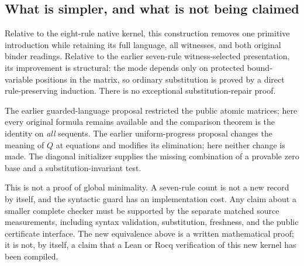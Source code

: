 \subsection{What is simpler, and what is not being claimed}

Relative to the eight-rule native kernel, this construction removes one
primitive introduction while retaining its full language, all witnesses,
and both original binder readings.  Relative to the earlier seven-rule
witness-selected presentation, its improvement is structural: the mode
depends only on protected bound-variable positions in the matrix, so
ordinary substitution is proved by a direct rule-preserving induction.
There is no exceptional substitution-repair proof.

The earlier guarded-language proposal restricted the public atomic
matrices; here every original formula remains available and the comparison
theorem is the identity on \emph{all} sequents.  The earlier
uniform-progress proposal changes the meaning of $Q$ at equations and
modifies its elimination; here neither change is made.  The diagonal
initializer supplies the missing combination of a provable zero base and
a substitution-invariant test.

This is not a proof of global minimality.  A seven-rule count is not a
new record by itself, and the syntactic guard has an implementation cost.
Any claim about a smaller complete checker must be supported by the
separate matched source measurements, including syntax validation,
substitution, freshness, and the public certificate interface.
The new equivalence above is a written mathematical proof; it is not, by
itself, a claim that a Lean or Rocq verification of this new kernel has
been compiled.

